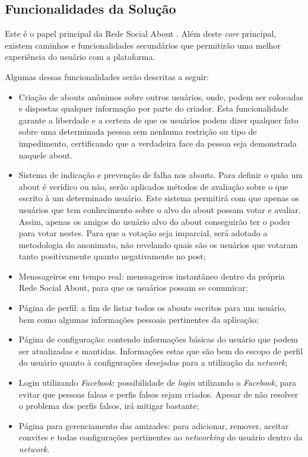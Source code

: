\subsection{Funcionalidades da Solução}
\label{sub:propostadesolucao}
Este é o papel principal da Rede Social About . Além deste \textit{core} principal, existem caminhos e funcionalidades
secundários  que permitirão uma melhor experiência do usuário com a plataforma.

Algumas dessas funcionalidades serão descritas a seguir:

\begin{itemize}
    \item Criação de abouts anônimos sobre outros usuários, onde, podem ser colocadas e dispostas
        qualquer informação por parte do criador. Esta funcionalidade garante a liberdade
        e a certeza de que os usuários podem dizer qualquer fato sobre uma determinada pessoa
        sem nenhuma restrição ou tipo de impedimento, certificando que a verdadeira
        face da pessoa seja demonstrada naquele about.
    \item Sistema de indicação e prevenção de falha nos abouts. Para definir o quão um about é
        verídico ou não, serão aplicados métodos de avaliação sobre o que escrito
        à um determinado usuário. Este sistema permitirá com que apenas os usuários que tem
        conhecimento sobre o alvo do about possam votar e avaliar. Assim, apenas
        os amigos do usuário alvo do about conseguirão ter o poder para votar nestes.
        Para que a votação seja imparcial, será adotado a metodologia do anonimato,
        não revelando quais são os usuários que votaram tanto positivamente quanto negativamente
        no post;
    \item Menssageiros em tempo real: menssageiros instantâneo dentro da própria Rede Social About, para que os usuários possam se
        comunicar;
    \item Página de perfil: a fim de listar todos os abouts escritos para um usuário, bem como algumas informações
        pessoais pertinentes da aplicação;
    \item Página de configuração: contendo informações básicas do usuário que podem ser atualizadas e mantidas.
        Informações estas que são bem do escopo de perfil do usuário quanto à configurações desejadas
        para a utilização da \textit{network};
    \item Login utilizando \textit{Facebook}: possibilidade de \textit{login} utilizando o \textit{Facebook}, para evitar que pessoas
        falsas e perfis falsos sejam criados. Apesar de não resolver o problema dos perfis falsos,
        irá mitigar bastante;
    \item Página para gerenciamento das amizades: para adicionar, remover, aceitar convites e todas configurações
        pertinentes ao \textit{networking} do usuário dentro da \textit{network}.
\end{itemize}

